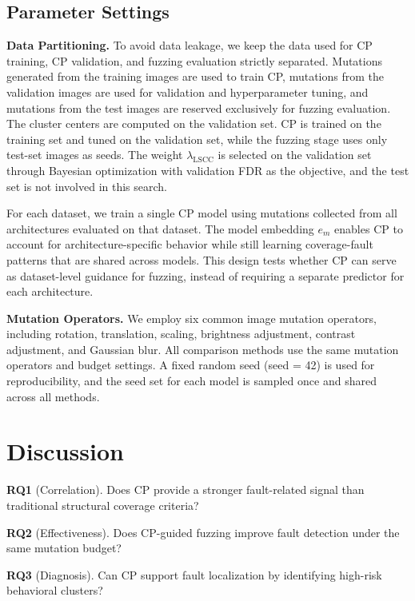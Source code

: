 \documentclass[preprint,number,5p,twocolumn]{elsarticle}
\begin{document}
\subsection{Parameter Settings}

\textbf{Data Partitioning.} To avoid data leakage, we keep the data used for CP training, CP validation, and fuzzing evaluation strictly separated. Mutations generated from the training images are used to train CP, mutations from the validation images are used for validation and hyperparameter tuning, and mutations from the test images are reserved exclusively for fuzzing evaluation. The cluster centers are computed on the validation set. CP is trained on the training set and tuned on the validation set, while the fuzzing stage uses only test-set images as seeds. The weight $\lambda_{\mathrm{LSCC}}$ is selected on the validation set through Bayesian optimization with validation FDR as the objective, and the test set is not involved in this search.

For each dataset, we train a single CP model using mutations collected from all architectures evaluated on that dataset. The model embedding $e_m$ enables CP to account for architecture-specific behavior while still learning coverage-fault patterns that are shared across models. This design tests whether CP can serve as dataset-level guidance for fuzzing, instead of requiring a separate predictor for each architecture.

\textbf{Mutation Operators.} We employ six common image mutation operators, including rotation, translation, scaling, brightness adjustment, contrast adjustment, and Gaussian blur. All comparison methods use the same mutation operators and budget settings. A fixed random seed (seed = 42) is used for reproducibility, and the seed set for each model is sampled once and shared across all methods.

\section{Discussion}\label{sec:results}

\textbf{RQ1} (Correlation). Does CP provide a stronger fault-related signal than traditional structural coverage criteria?

\textbf{RQ2} (Effectiveness). Does CP-guided fuzzing improve fault detection under the same mutation budget?

\textbf{RQ3} (Diagnosis). Can CP support fault localization by identifying high-risk behavioral clusters?
\end{document}
